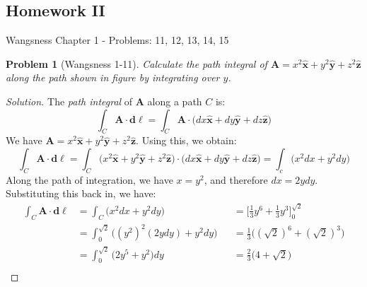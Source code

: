 \documentclass{article}
\theoremstyle{mystyle}
\newtheorem{problem}{Problem}[section]
\begin{document}
\subsection{Homework II}
Wangsness Chapter 1 - Problems: 11, 12, 13, 14, 15
\begin{problem}[Wangsness 1-11]
\label{problem:EMAG_1_Wangsness_1_11}
Calculate the path integral of $\mathbf{A}=x^2\hat{\mathbf{x}}+y^2\hat{\mathbf{y}}+z^2\hat{\mathbf{z}}$ along the path shown in figure  by integrating over $y$.
\end{problem}
\begin{proof}[Solution]
The \textit{path integral} of $\mathbf{A}$ along a path $C$ is:
\begin{equation*}
    \int_{C}\mathbf{A}\cdot\boldsymbol{d\ell}=\int_{C}\mathbf{A}\cdot\big(dx\hat{\mathbf{x}}+dy\hat{\mathbf{y}}+dz\hat{\mathbf{z}}\big)
\end{equation*}
We have $\mathbf{A}=x^{2}\hat{\mathbf{x}}+y^{2}\hat{\mathbf{y}}+z^{2}\hat{\mathbf{z}}$. Using this, we obtain:
\begin{equation*}
    \int_{C}\mathbf{A}\cdot\boldsymbol{d\ell}=\int_{C}\big(x^{2}\hat{\mathbf{x}}+y^{2}\hat{\mathbf{y}}+z^{2}\hat{\mathbf{z}}\big)\cdot\big(dx\hat{\mathbf{x}}+dy\hat{\mathbf{y}}+dz\hat{\mathbf{z}}\big)=\int_{c}\big(x^2dx+y^2dy\big)
\end{equation*}
Along the path of integration, we have $x=y^2$, and therefore $dx = 2ydy$. Substituting this back in, we have:
\begin{align*}
    \int_{C}\mathbf{A}\cdot\boldsymbol{d\ell}&=\int_{C}\big(x^{2}dx+y^{2}dy\big)& &=\bigg[\frac{1}{3}y^{6}+\frac{1}{3}y^{3}\bigg]_{0}^{\sqrt{2}}\\
    &=\int_{0}^{\sqrt{2}}\big((y^{2})^{2}(2ydy) + y^{2}dy\big) & &=\frac{1}{3}\big((\sqrt{2})^{6}+(\sqrt{2})^{3}\big)\\
    &=\int_{0}^{\sqrt{2}}\big(2y^{5}+y^{2}\big)dy& &=\frac{2}{3}\big(4+\sqrt{2}\big)\\
\end{align*}
\end{proof}
\end{document}
